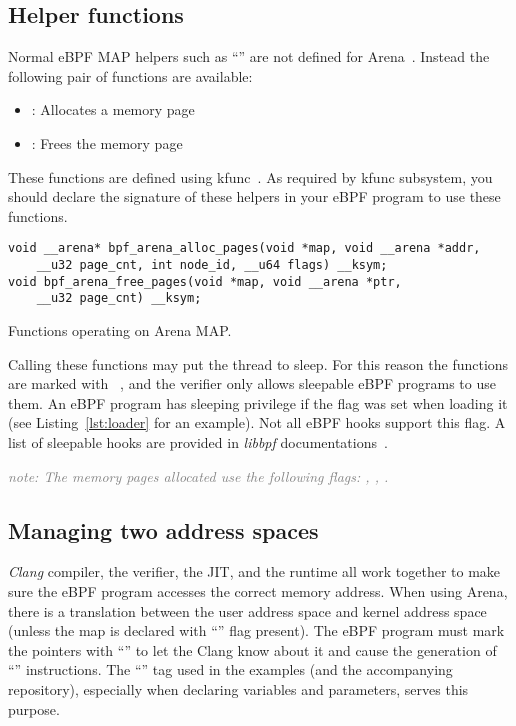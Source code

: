 \documentclass{article} \usepackage{graphicx}
\begin{document}
\subsection{Helper functions}
Normal eBPF MAP helpers such as ``'' are not
defined for Arena~\cite{arena_source}. Instead the following pair of functions
are available:
\begin{itemize}
    \item {}: Allocates a memory page
    \item {}: Frees the memory page
\end{itemize}

These functions are defined using kfunc~\cite{eunomia_kfunc, ebpf_docs_kfunc}.
As required by kfunc subsystem, you should declare the signature of these
helpers in your eBPF program to use these functions.
\begin{listing}
\begin{verbatim}
void __arena* bpf_arena_alloc_pages(void *map, void __arena *addr,
    __u32 page_cnt, int node_id, __u64 flags) __ksym;
void bpf_arena_free_pages(void *map, void __arena *ptr,
    __u32 page_cnt) __ksym;
\end{verbatim}
\caption{Functions operating on Arena MAP.}
\label{lst:arena_kfuncs}
\end{listing}

Calling these functions may put the thread to sleep. For this reason the
functions are marked with ~\cite{arena_source}, and the
verifier only allows sleepable eBPF programs to use them. An eBPF program has
sleeping privilege if the  flag was set when loading it
(see Listing~\ref{lst:loader} for an example).
Not all eBPF hooks support this flag. A list of sleepable
hooks are provided in \emph{libbpf} documentations~\cite{libbpf_sleepable}.

\textcolor{gray}{\emph{note: The memory pages allocated use the following flags:
, , .}}

\subsection{Managing two address spaces}

\emph{Clang} compiler, the verifier, the JIT, and the runtime all work together
to make sure the eBPF program accesses the correct memory address. When using
Arena, there is a translation between the user address space and kernel address
space (unless the map is declared with ``'' flag
present). The eBPF program must mark the pointers with
``'' to let the Clang know about it and
cause the generation of ``'' instructions. The
``'' tag used in the examples (and the accompanying repository),
especially when declaring variables and parameters, serves this purpose.
\end{document}
